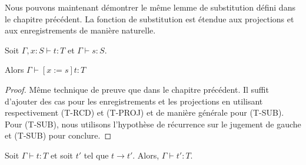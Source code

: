 Nous pouvons maintenant démontrer le même lemme de substitution défini dans le
chapitre précédent. La fonction de substitution est étendue aux projections et
aux enregistrements de manière naturelle.

\begin{lemma} 
  \label{lemma:subtyping-record-substitution}
  Soit $\Gamma, x : S \vdash t : T$ et $\Gamma \vdash s : S$.

  Alors $\Gamma \vdash [x := s] t : T$
\end{lemma}

\begin{proof}
  Même technique de preuve que dans le chapitre précédent. Il suffit d'ajouter 
  des cas pour les enregistrements et les projections en utilisant
  respectivement (T-RCD) et (T-PROJ) et de manière générale pour (T-SUB). Pour
  (T-SUB), nous utilisons l'hypothèse de récurrence sur le jugement de gauche et
(T-SUB) pour conclure.
\end{proof}

\begin{theorem} 
  Soit $\Gamma \vdash t : T$ et soit $t'$ tel que $t \rightarrow t'$. Alors,
  $\Gamma \vdash t' : T$.
\end{theorem}

